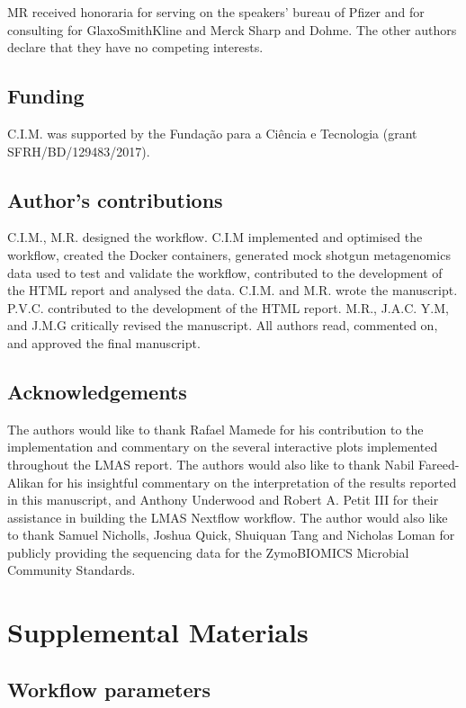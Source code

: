 MR received honoraria for serving on the speakers' bureau of Pﬁzer and for consulting for GlaxoSmithKline and Merck Sharp and Dohme. The other authors declare that they have no competing interests. 

\subsection{Funding}

C.I.M. was supported by the Fundação para a Ciência e Tecnologia (grant SFRH/BD/129483/2017).

\subsection{Author’s contributions}

C.I.M., M.R. designed the workflow. C.I.M implemented and optimised the workflow, created the Docker containers, generated mock shotgun metagenomics data used to test and validate the workflow, contributed to the development of the HTML report and analysed the data. C.I.M. and M.R. wrote the manuscript. P.V.C. contributed to the development of the HTML report. M.R., J.A.C. Y.M, and J.M.G critically revised the manuscript.  All authors read, commented on, and approved the final manuscript. 

\subsection{Acknowledgements}

The authors would like to thank Rafael Mamede for his contribution to the implementation and commentary on the several interactive plots implemented throughout the LMAS report. The authors would also like to thank Nabil Fareed-Alikan for his insightful commentary on the interpretation of the results reported in this manuscript, and Anthony Underwood and Robert A. Petit III for their assistance in building the LMAS Nextflow workflow. The author would also like to thank Samuel Nicholls, Joshua Quick, Shuiquan Tang and Nicholas Loman for publicly providing the sequencing data for the ZymoBIOMICS Microbial Community Standards.

\section{Supplemental Materials}

\subsection{Workflow parameters}

